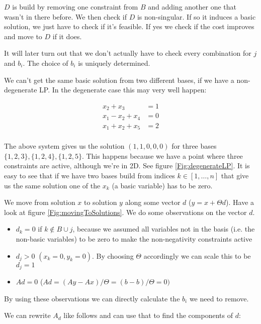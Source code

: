 $D$ is build by removing one constraint from $B$ and adding another one that wasn't in there before. We then check if $D$ is non-singular. If so it induces a basic solution, we just have to check if it's feasible. If yes we check if the cost improves and move to $D$ if it does.

It will later turn out that we don't actually have to check every combination for $j$ and $b_i$. The choice of $b_i$ is uniquely determined.

We can't get the same basic solution from two different bases, if we have a non-degenerate LP. In the degenerate case this may very well happen:

\begin{align*}
x_2 + x_3 &= 1\\
x_1 - x_2 +x_4 &=0\\
x_1 + x_2 +x_5 &= 2\\
\end{align*}


The above system gives us the solution $(1,1,0,0,0)$ for three bases $\{1,2,3\},\{1,2,4\},\{1,2,5\}$. This happens because we have a point where three constraints are active, although we're in 2D. See figure \ref{Fig:degenerateLP}. It is easy to see that if we have two bases build from indices $k\in [1,\ldots,n]$ that give us the same solution one of the $x_k$ (a basic variable) has to be zero. %


We move from solution $x$ to solution $y$ along some vector $d$ ($y=x+\Theta d$). Have a look at figure \ref{Fig:movingToSolutions}. We do some observations on the vector $d$. 

\begin{itemize}
\item $d_k=0$ if $k\not \in B \cup j$, because we assumed all variables not in the basis (i.e. the non-basic variables) to be zero to make the non-negativity constraints active 
\item $d_j>0$ $(x_k=0, y_k=0)$. By choosing $\Theta$ accordingly we can scale this to be $d_j=1$
\item $Ad = 0$ ($Ad = (Ay-Ax)/\Theta = (b-b)/\Theta = 0)$
\end{itemize}

By using these observations we can directly calculate the $b_i$ we need to remove.

We can rewrite $A_d$ like follows and can use that to find the components of $d$:

